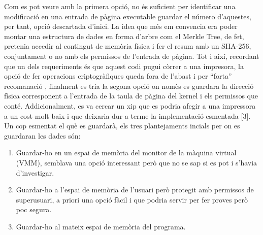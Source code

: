 ﻿\documentclass[10pt,a4paper,twocolumn,twoside]{article}
\begin{document}
Com es pot veure amb la primera opció, no és suficient per identificar una modificació en una entrada de pàgina executable guardar el número d’aquestes, per tant, opció descartada d’inici. La idea que més em convencia era poder montar una estructura de dades en forma d’arbre com el Merkle Tree, de fet, pretenia accedir al contingut de memòria física i fer el resum amb un SHA-256, conjuntament o no amb els permissos de l’entrada de pàgina. Tot i així, recordant que un dels requeriments és que aquest codi pugui còrrer a una impresora, la opció de fer operacions criptogràfiques queda fora de l’abast i per “forta” recomanació , finalment es tria la segona opció on nomès es guardara la direcció física corresponent a l’entrada de la taula de pàgina del kernel i els permissos que conté. Addicionalment, es va cercar un xip que es podria afegir a una impressora a un cost molt baix i que deixaria dur a terme la implementació esmentada [3].
Un cop esmentat el què es guardarà, els tres plantejaments incials per on es guardaran les dades són:



\begin{enumerate}
\item Guardar-ho en un espai de memòria del monitor de la màquina virtual (VMM), semblava
una opció interessant però que no se sap si es pot i s’havia d’investigar.
\item Guardar-ho a l’espai de memòria de l’usuari però protegit amb permissos de superusuari, a priori una opció fàcil i que podria servir per fer proves però poc segura.
\item Guardar-ho al mateix espai de memòria del programa.
\end{enumerate}
\end{document}

